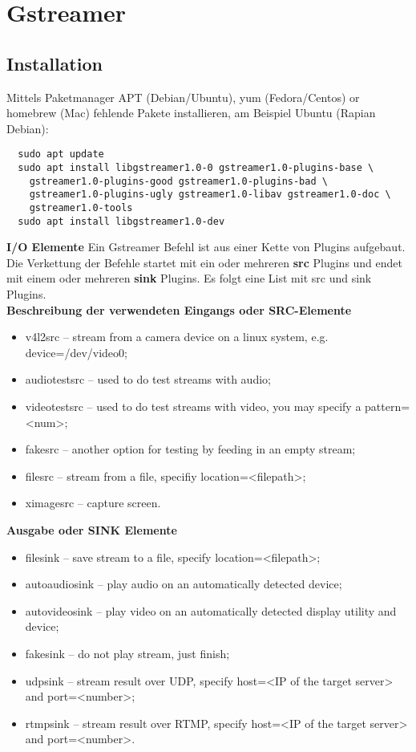 \section{Gstreamer} \label{RefGstreamer}

\subsection{Installation}
Mittels Paketmanager APT (Debian/Ubuntu), yum (Fedora/Centos) or homebrew (Mac) 
fehlende Pakete installieren, am Beispiel Ubuntu (Rapian Debian):
\begin{verbatim}
  sudo apt update 
  sudo apt install libgstreamer1.0-0 gstreamer1.0-plugins-base \
    gstreamer1.0-plugins-good gstreamer1.0-plugins-bad \
    gstreamer1.0-plugins-ugly gstreamer1.0-libav gstreamer1.0-doc \
    gstreamer1.0-tools
  sudo apt install libgstreamer1.0-dev
\end{verbatim}

\textbf{I/O Elemente}
Ein Gstreamer Befehl ist aus einer Kette von Plugins aufgebaut. Die Verkettung der Befehle startet mit ein oder mehreren \textbf{src} Plugins und endet mit einem oder mehreren \textbf{sink} Plugins. Es folgt eine List mit src und sink Plugins.\\

\textbf{Beschreibung der verwendeten Eingangs oder SRC-Elemente}
\begin{itemize}
\item v4l2src – stream from a camera device on a linux system, e.g. device=/dev/video0;
\item audiotestsrc – used to do test streams with audio;
\item videotestsrc – used to do test streams with video, you may specify a pattern=<num>;
\item fakesrc – another option for testing by feeding in an empty stream;
\item filesrc – stream from a file, specifiy location=<filepath>;
\item ximagesrc – capture screen.
\end{itemize}

\textbf{Ausgabe oder SINK Elemente}
\begin{itemize}
\item filesink – save stream to a file, specify location=<filepath>;
\item  autoaudiosink – play audio on an automatically detected device;
\item  autovideosink – play video on an automatically detected display utility and device;
\item  fakesink – do not play stream, just finish;
\item  udpsink – stream result over UDP, specify host=<IP of the target server> and port=<number>;
\item rtmpsink – stream result over RTMP, specify host=<IP of the target server> and port=<number>.
\end{itemize}

